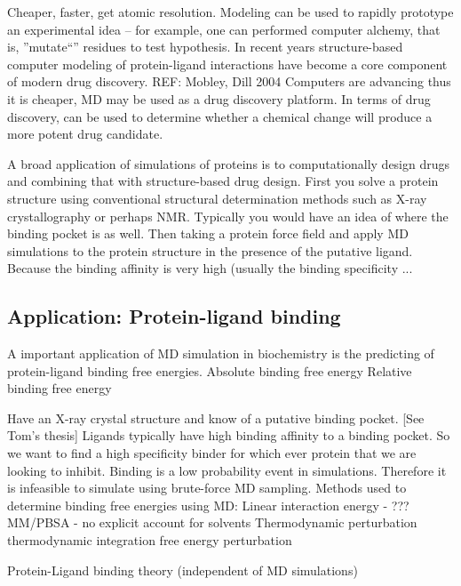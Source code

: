 \1 Cheaper, faster, get atomic resolution. Modeling can be used to rapidly prototype an experimental idea -- for example, one can performed computer alchemy, that is, ''mutate``'' residues to test hypothesis. In recent years structure-based computer modeling of protein-ligand interactions have become a core component of modern drug discovery. REF: Mobley, Dill 2004 Computers are advancing thus it is cheaper, MD may be used as a drug discovery platform. In terms of drug discovery, can be used to determine whether a chemical change will produce a more potent drug candidate.

\1 A broad application of simulations of proteins is to computationally design drugs and combining that with structure-based drug design.
  \2 First you solve a protein structure using conventional structural determination methods such as X-ray crystallography or perhaps NMR.  Typically you would have an idea of where the binding pocket is as well. 
  \2 Then taking a protein force field and apply MD simulations to the protein structure in the presence of the putative ligand.  Because the binding affinity is very high (usually the binding specificity ...


\subsection{Application: Protein-ligand binding}
\1 A important application of MD simulation in biochemistry is the predicting of protein-ligand binding free energies.
  \2 
  \2 Absolute binding free energy
  \2 Relative binding free energy

\1 Have an X-ray crystal structure and know of a putative binding pocket. [See Tom's thesis]
\1 Ligands typically have high binding affinity to a binding pocket. So we want to find a high specificity binder for which ever protein that we are looking to inhibit.
  \2 Binding is a low probability event in simulations. Therefore it is infeasible to simulate using brute-force MD sampling.
  \2 Methods used to determine binding free energies using MD: 
  \3 Linear interaction energy - ???
  \3 MM/PBSA - no explicit account for solvents
  \3 Thermodynamic perturbation 
       \4 thermodynamic integration
       \4 free energy perturbation

\1 Protein-Ligand binding theory (independent of MD simulations)

